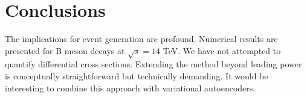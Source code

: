 \section{Conclusions}\label{sec:conclusions}

The implications for event generation are profound. Numerical results
are presented for B meson decays at $\sqrt{s} = 14$ TeV. We have not
attempted to quantify differential cross sections. Extending the method
beyond leading power is conceptually straightforward but technically
demanding. It would be interesting to combine this approach with
variational autoencoders.

